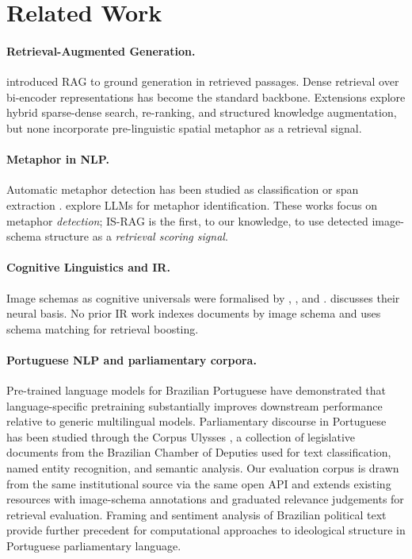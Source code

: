 \documentclass[11pt,a4paper]{article}
\begin{document}
\section{Related Work}
\label{sec:related}

\paragraph{Retrieval-Augmented Generation.}
\citet{lewis2020rag} introduced RAG to ground generation in retrieved
passages. Dense retrieval over bi-encoder representations
\citep{karpukhin2020dpr} has become the standard backbone. Extensions
explore hybrid sparse-dense search, re-ranking, and structured
knowledge augmentation, but none incorporate pre-linguistic spatial
metaphor as a retrieval signal.

\paragraph{Metaphor in NLP.}
Automatic metaphor detection has been studied as classification or
span extraction \citep{shutova2010,tsvetkov2014}.
\citet{wachowiak2023,wachowiak-gromann-2022-systematic} explore LLMs for metaphor identification. These
works focus on metaphor \emph{detection}; IS-RAG is the first, to our
knowledge, to use detected image-schema structure as a
\emph{retrieval scoring signal}.

\paragraph{Cognitive Linguistics and IR.}
Image schemas as cognitive universals were formalised by
\citet{lakoff1980}, \citet{johnson1987}, and \citet{talmy1988}.
\citet{feldman2006} discusses their neural basis. No prior IR work
indexes documents by image schema and uses schema matching for
retrieval boosting.

\paragraph{Portuguese NLP and parliamentary corpora.}
Pre-trained language models for Brazilian Portuguese
\citep{souza2020bertimbau} have demonstrated that language-specific
pretraining substantially improves downstream performance relative to
generic multilingual models.
Parliamentary discourse in Portuguese has been studied through the
Corpus Ulysses \citep{albuquerque2022ulyssesner}, a collection of legislative
documents from the Brazilian Chamber of Deputies used for text
classification, named entity recognition, and semantic analysis.
Our evaluation corpus is drawn from the same institutional source
via the same open API and extends existing resources with
image-schema annotations and graduated relevance judgements for
retrieval evaluation.
Framing and sentiment analysis of Brazilian political text
\citep{vargas2021bert} provide further precedent for
computational approaches to ideological structure in Portuguese
parliamentary language.
\end{document}
